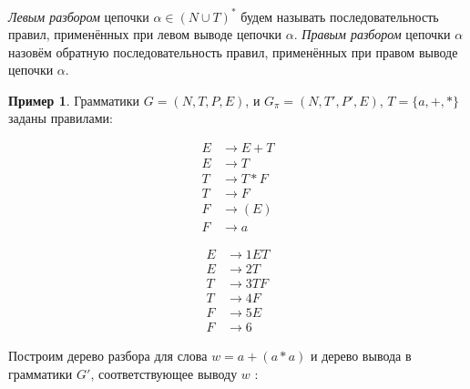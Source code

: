 \documentclass[12pt]{article}
\theoremstyle{definiton}
\theoremstyle{definition}
\theoremstyle{definition}
\newtheorem{Example}{Пример}
\theoremstyle{definition}
\begin{document}
\emph{Левым разбором } цепочки $\alpha \in (N\cup T)^*$ будем называть последовательность правил, применённых при левом выводе цепочки $\alpha$. \emph{Правым разбором} цепочки $\alpha$ назовём обратную последовательность правил, применённых при правом выводе цепочки $\alpha$.

\begin{Example}\label{GTree}
	Грамматики $G = (N,T,P,E)$, и $G_\pi = (N,T',P',E)$, $T = \{a, +, *\}$ заданы правилами:
	\begin{multicols}{2}		
		\begin{align}
		 	E &\to E+T\\
		 	E &\to T\\
		 	T &\to T*F\\
			T &\to F\\
		 	F &\to (E)\\
		 	F &\to a
		\end{align}
		
		\begin{align*}
		 	E &\to 1ET\\
		 	E &\to 2T\\
		 	T &\to 3TF\\
			T &\to 4F\\
		 	F &\to 5E\\
		 	F &\to 6
		\end{align*}
	\end{multicols}

	Построим дерево разбора для слова $w = a + (a * a)$ и дерево вывода в грамматики $G'$, соответствующее выводу $w$ :
	\newpage
	
	\begin{multicols}{2}
		\begin{flushleft}
			
				\end{flushleft}
		\begin{flushright}
			

\end{flushright}
\end{multicols}
\end{Example}
\end{document}
